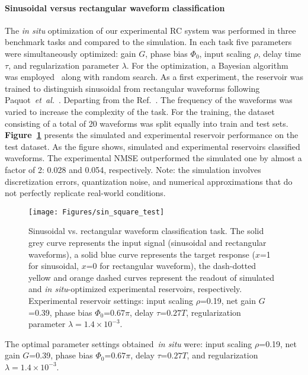 \documentclass{WileyMSP-template}
\begin{document}
\paragraph{Sinusoidal versus rectangular waveform classification}
The \emph{in situ} optimization of our experimental RC system was performed in three benchmark tasks and compared to the simulation.
In each task five parameters were simultaneously optimized: gain $G$, phase bias $\Phi_0$, input scaling $\rho$, delay time $\tau$, and regularization parameter $\lambda$.
For the optimization, a Bayesian algorithm was employed~\cite{ref:bergstra2011,ref:trouvain2020,ref:hinaut2021} along with random search.
As a first experiment, the reservoir was trained to distinguish sinusoidal from rectangular waveforms following Paquot~\emph{et~al.}~\cite{ref:paquot2012}.
Departing from the Ref.~\cite{ref:paquot2012}. The frequency of the waveforms was varied to increase the complexity of the task.
For the training, the dataset consisting of a total of 20 waveforms was split equally into train and test sets. 
\textbf{Figure~\ref{fig:sin_square}} presents the simulated and experimental reservoir performance on the test dataset.
As the figure shows, simulated and experimental reservoirs classified waveforms.
The experimental NMSE outperformed the simulated one by almost a factor of 2: 0.028 and 0.054, respectively. Note: the simulation involves discretization errors, quantization noise, and numerical approximations that do not perfectly replicate real-world conditions.
\begin{figure}[htpb]
  \centering
  \texttt{[image: Figures/sin\_square\_test]}
  \caption{Sinusoidal vs. rectangular waveform classification task. The solid grey curve represents the input signal (sinusoidal and rectangular waveforms), a solid blue curve represents the target response ($x$=1 for sinusoidal, $x$=0 for rectangular waveform), the dash-dotted yellow and orange dashed curves represent the readout of simulated and \emph{in situ}-optimized experimental reservoirs, respectively. Experimental reservoir settings: input scaling $\rho$=0.19, net gain $G$=0.39, phase bias $\Phi_0$=$0.67\pi$, delay $\tau$=$0.27T$, regularization parameter $\lambda=1.4\times10^{-3}$.}
  \label{fig:sin_square}
\end{figure}

The optimal parameter settings obtained~\emph{in situ} were: input scaling $\rho$=0.19, net gain $G$=0.39, phase bias $\Phi_0$=$0.67\pi$, delay $\tau$=$0.27T$, and regularization $\lambda=1.4\times10^{-3}$.
\end{document}
